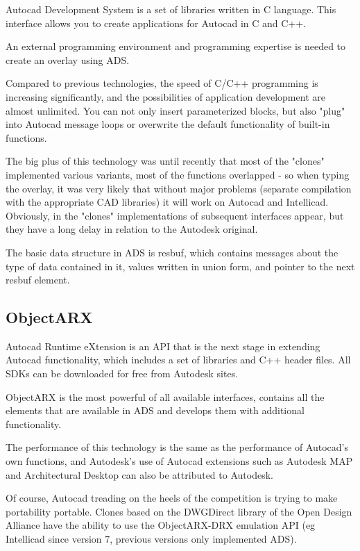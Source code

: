 \documentclass[a4paper, 11pt, article]{report}
\begin{document}
Autocad Development System is a set of libraries written in C language. This interface allows you to create applications for Autocad in C and C++.

An external programming environment and programming expertise is needed to create an overlay using ADS.

Compared to previous technologies, the speed of C/C++ programming is increasing significantly, and the possibilities of application development are almost unlimited. You can not only insert parameterized blocks, but also "plug" into Autocad message loops or overwrite the default functionality of built-in functions.

The big plus of this technology was until recently that most of the "clones" implemented various variants, most of the functions overlapped - so when typing the overlay, it was very likely that without major problems (separate compilation with the appropriate CAD libraries) it will work on Autocad and Intellicad. Obviously, in the "clones" implementations of subsequent interfaces appear, but they have a long delay in relation to the Autodesk original.

The basic data structure in ADS is resbuf, which contains messages about the type of data contained in it, values written in union form, and pointer to the next resbuf element.
 
\subsection{ObjectARX}

Autocad Runtime eXtension is an API that is the next stage in extending Autocad functionality, which includes a set of libraries and C++ header files. All SDKs can be downloaded for free from Autodesk sites.

ObjectARX is the most powerful of all available interfaces, contains all the elements that are available in ADS and develops them with additional functionality.

The performance of this technology is the same as the performance of Autocad's own functions, and Autodesk's use of Autocad extensions such as Autodesk MAP and Architectural Desktop can also be attributed to Autodesk.

Of course, Autocad treading on the heels of the competition is trying to make portability portable. Clones based on the DWGDirect library of the Open Design Alliance have the ability to use the ObjectARX-DRX emulation API (eg Intellicad since version 7, previous versions only implemented ADS).
\end{document}
